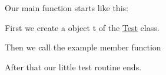  Our main function starts like this\-: 
\begin{DoxyCodeInclude}

\end{DoxyCodeInclude}
 First we create a object {\ttfamily t} of the \hyperlink{classTest}{Test} class. 
\begin{DoxyCodeInclude}

\end{DoxyCodeInclude}
 Then we call the example member function 
\begin{DoxyCodeInclude}

\end{DoxyCodeInclude}
 After that our little test routine ends. 
\begin{DoxyCodeInclude}

\end{DoxyCodeInclude}
 